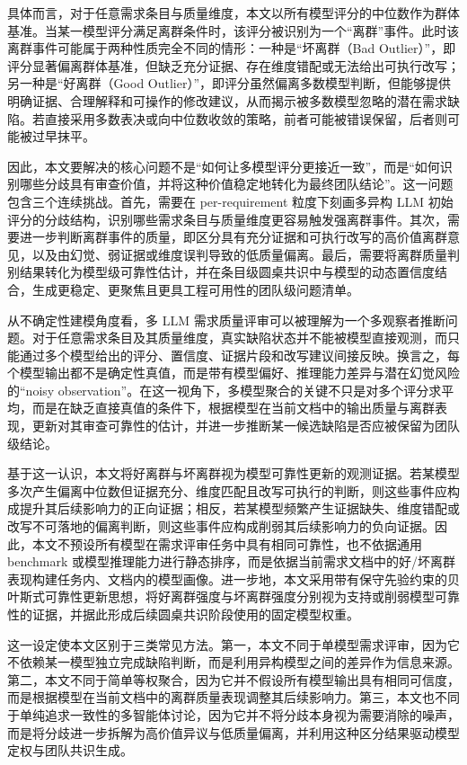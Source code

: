 \documentclass[a4paper,11pt]{ctexart}
\begin{document}
具体而言，对于任意需求条目与质量维度，本文以所有模型评分的中位数作为群体基准。当某一模型评分满足离群条件时，该评分被识别为一个“离群”事件。此时该离群事件可能属于两种性质完全不同的情形：一种是“坏离群（Bad Outlier）”，即评分显著偏离群体基准，但缺乏充分证据、存在维度错配或无法给出可执行改写；另一种是“好离群（Good Outlier）”，即评分虽然偏离多数模型判断，但能够提供明确证据、合理解释和可操作的修改建议，从而揭示被多数模型忽略的潜在需求缺陷。若直接采用多数表决或向中位数收敛的策略，前者可能被错误保留，后者则可能被过早抹平。

因此，本文要解决的核心问题不是“如何让多模型评分更接近一致”，而是“如何识别哪些分歧具有审查价值，并将这种价值稳定地转化为最终团队结论”。这一问题包含三个连续挑战。首先，需要在 per-requirement 粒度下刻画多异构 LLM 初始评分的分歧结构，识别哪些需求条目与质量维度更容易触发强离群事件。其次，需要进一步判断离群事件的质量，即区分具有充分证据和可执行改写的高价值离群意见，以及由幻觉、弱证据或维度误判导致的低质量偏离。最后，需要将离群质量判别结果转化为模型级可靠性估计，并在条目级圆桌共识中与模型的动态置信度结合，生成更稳定、更聚焦且更具工程可用性的团队级问题清单。

从不确定性建模角度看，多 LLM 需求质量评审可以被理解为一个多观察者推断问题。对于任意需求条目及其质量维度，真实缺陷状态并不能被模型直接观测，而只能通过多个模型给出的评分、置信度、证据片段和改写建议间接反映。换言之，每个模型输出都不是确定性真值，而是带有模型偏好、推理能力差异与潜在幻觉风险的“noisy observation”。在这一视角下，多模型聚合的关键不只是对多个评分求平均，而是在缺乏直接真值的条件下，根据模型在当前文档中的输出质量与离群表现，更新对其审查可靠性的估计，并进一步推断某一候选缺陷是否应被保留为团队级结论。

基于这一认识，本文将好离群与坏离群视为模型可靠性更新的观测证据。若某模型多次产生偏离中位数但证据充分、维度匹配且改写可执行的判断，则这些事件应构成提升其后续影响力的正向证据；相反，若某模型频繁产生证据缺失、维度错配或改写不可落地的偏离判断，则这些事件应构成削弱其后续影响力的负向证据。因此，本文不预设所有模型在需求评审任务中具有相同可靠性，也不依据通用 benchmark 或模型推理能力进行静态排序，而是依据当前需求文档中的好/坏离群表现构建任务内、文档内的模型画像。进一步地，本文采用带有保守先验约束的贝叶斯式可靠性更新思想，将好离群强度与坏离群强度分别视为支持或削弱模型可靠性的证据，并据此形成后续圆桌共识阶段使用的固定模型权重。

这一设定使本文区别于三类常见方法。第一，本文不同于单模型需求评审，因为它不依赖某一模型独立完成缺陷判断，而是利用异构模型之间的差异作为信息来源。第二，本文不同于简单等权聚合，因为它并不假设所有模型输出具有相同可信度，而是根据模型在当前文档中的离群质量表现调整其后续影响力。第三，本文也不同于单纯追求一致性的多智能体讨论，因为它并不将分歧本身视为需要消除的噪声，而是将分歧进一步拆解为高价值异议与低质量偏离，并利用这种区分结果驱动模型定权与团队共识生成。
\end{document}
